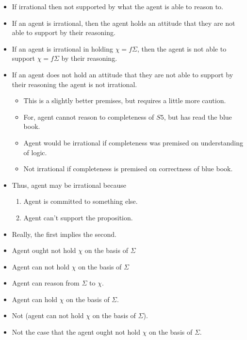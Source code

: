 \documentclass[10pt]{article}
\begin{document}
\begin{itemize}
\item If irrational then not supported by what the agent is able to reason to.
\item If an agent is irrational, then the agent holds an attitude that they are not able to support by their reasoning.
\item If an agent is irrational in holding \(\chi = f\Sigma\), then the agent is not able to support \(\chi = f\Sigma\) by their reasoning.
\item If an agent does not hold an attitude that they are not able to support by their reasoning the agent is not irrational.
  \begin{itemize}
  \item This is a slightly better premises, but requires a little more caution.
  \item For, agent cannot reason to completeness of \(S5\), but has read the blue book.
  \item Agent would be irrational if completeness was premised on understanding of logic.
  \item Not irrational if completeness is premised on correctness of blue book.
  \end{itemize}
\item Thus, agent may be irrational because
  \begin{enumerate}
  \item Agent is committed to something else.
  \item Agent can't support the proposition.
  \end{enumerate}
\item Really, the first implies the second.
\end{itemize}

\begin{itemize}
\item Agent ought not hold \(\chi\) on the basis of \(\Sigma\)
\item Agent can not hold \(\chi\) on the basis of \(\Sigma\)
\item Agent can reason from \(\Sigma\) to \(\chi\).
\item Agent can hold \(\chi\) on the basis of \(\Sigma\).
\item Not (agent can not hold \(\chi\) on the basis of \(\Sigma\)).
\item Not the case that the agent ought not hold \(\chi\) on the basis of \(\Sigma\).
\end{itemize}
\end{document}
